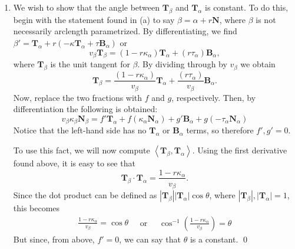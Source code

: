 \documentclass{article}
\begin{document}
\begin{enumerate}
\begin{enumerate}
\item We wish to show that the angle between $\mathbf{T}_{\beta}$ and $\mathbf{T}_{\alpha}$ is constant.
To do this, begin with the statement found in (a) to say $\beta = \alpha + r\mathbf{N}$, where $\beta$ is not necessarily arclength parametrized.
By differentiating, we find $\beta' = \mathbf{T}_{\alpha} + r(-\kappa\mathbf{T}_{\alpha} + \tau\mathbf{B}_{\alpha})$ or
\begin{equation*}
v_{\beta}\mathbf{T}_{\beta} = (1-r\kappa_{\alpha})\mathbf{T}_{\alpha} + (r\tau_{\alpha})\mathbf{B}_{\alpha},
\end{equation*}
where $\mathbf{T}_{\beta}$ is the unit tangent for $\beta$. 
By dividing through by $v_{\beta}$ we obtain
\begin{equation*}
\mathbf{T}_{\beta} = \frac{(1-r\kappa_{\alpha})}{v_{\beta}}\mathbf{T}_{\alpha} + \frac{(r\tau_{\alpha})}{v_{\beta}}\mathbf{B}_{\alpha}.
\end{equation*}
Now, replace the two fractions with $f$ and $g$, respectively.
Then, by differentiation the following is obtained:
\begin{equation*}
v_{\beta}\kappa_{\beta}\mathbf{N}_{\beta} = f'\mathbf{T}_{\alpha} + f(\kappa_{\alpha}\mathbf{N}_{\alpha}) + g'\mathbf{B}_{\alpha} + g(-\tau_{\alpha}\mathbf{N}_{\alpha})
\end{equation*}
Notice that the left-hand side has no $\mathbf{T}_{\alpha}$ or $\mathbf{B}_{\alpha}$ terms, so therefore $f',g' = 0$. 

To use this fact, we will now compute $\left<\mathbf{T}_{\beta},\mathbf{T}_{\alpha}\right>$.
Using the first derivative found above, it is easy to see that 
\begin{equation*}
\mathbf{T}_{\beta}\cdot\mathbf{T}_{\alpha} = \frac{1 - r\kappa_{\alpha}}{v_{\beta}}.
\end{equation*}
Since the dot product can be defined as $|\mathbf{T}_{\beta}||\mathbf{T}_{\alpha}|\cos{\theta}$, where $|\mathbf{T}_{\beta}|,|\mathbf{T}_{\alpha}| = 1$, this becomes
\begin{equation*}
\begin{split}
\frac{1 - r\kappa_{\alpha}}{v_{\beta}} = \cos{\theta}
\end{split}
\quad
\textrm{or}
\quad
\begin{split}
\cos^{-1}{\left(\frac{1 - r\kappa_{\alpha}}{v_{\beta}}\right)} = \theta
\end{split}
\end{equation*}
But since, from above, $f' = 0$, we can say that $\theta$ is a constant. \qed


\end{enumerate}
\end{enumerate}
\end{document}
